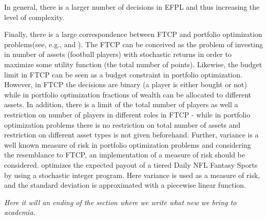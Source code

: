 In general, there is a larger number of decisions in EFPL and thus increasing the level of complexity. 

Finally, there is a large correspondence between FTCP and portfolio optimization problems(see, e.g., \cite{Markowitz} and \cite{Speranza}). The FTCP can be conceived as the problem of investing in number of assets (football players) with stochastic returns in order to maximize some utility function (the total number of points). Likewise, the budget limit in FTCP can be seen as a budget constraint in portfolio optimization. However, in FTCP the decisions are binary (a player is either bought or not) while in portfolio optimization fractions of wealth can be allocated to different assets. In addition, there is a limit of the total number of players as well a restriction on number of players in different roles in FTCP - while in portfolio optimization problems there is no restriction on total number of assets and restriction on different asset types is not given beforehand. Further, variance is a well known measure of risk in portfolio optimization problems and considering the resemblance to FTCP, an implementation of a measure of risk should be considered. \cite{Dailyfantasysports} optimizes the expected payout of a tiered Daily NFL Fantasy Sports by using a stochastic integer program. Here variance is used as a measure of risk, and the standard deviation is approximated with a piecewise linear function. 


\newpar

\textit{Here it will an ending of the section where we write what new we bring to academia.}
\begin{comment}
- på samme måte at man har en budget limit finnes det også budget constraints i portfolio. 
- i portfolio kan man investere fraksjoner i assets, mens i ftcp er valgene binary, enten er spilleren med på laget eller ikke. 
- en forskjell er også at i ftcp har man en limit på hvor mange spillere man skal ha totalt, men også en grense på antall spillere i forskjellige roller, mens i portfolje er vanligvis asset classes ikke gitt på forhånd. 
- risk er et viktig og vanlig aspekt i portfølge optimeringen
- skrive om daily fantasy sports artikkelen 
\end{comment}



